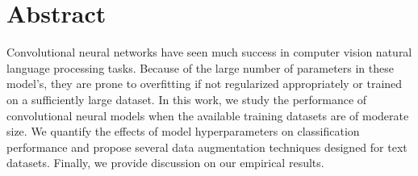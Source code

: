 

\chapter*{Abstract}
Convolutional neural networks have seen much success in computer vision natural language processing tasks.
Because of the large number of parameters in these model's, they are prone to overfitting
if not regularized appropriately or trained on a sufficiently large dataset.
In this work, we study the performance of convolutional neural models when the available training datasets
are of moderate size. We quantify the effects of model hyperparameters on classification performance
and propose several data augmentation techniques designed for text datasets.
Finally, we provide discussion on our empirical results.
